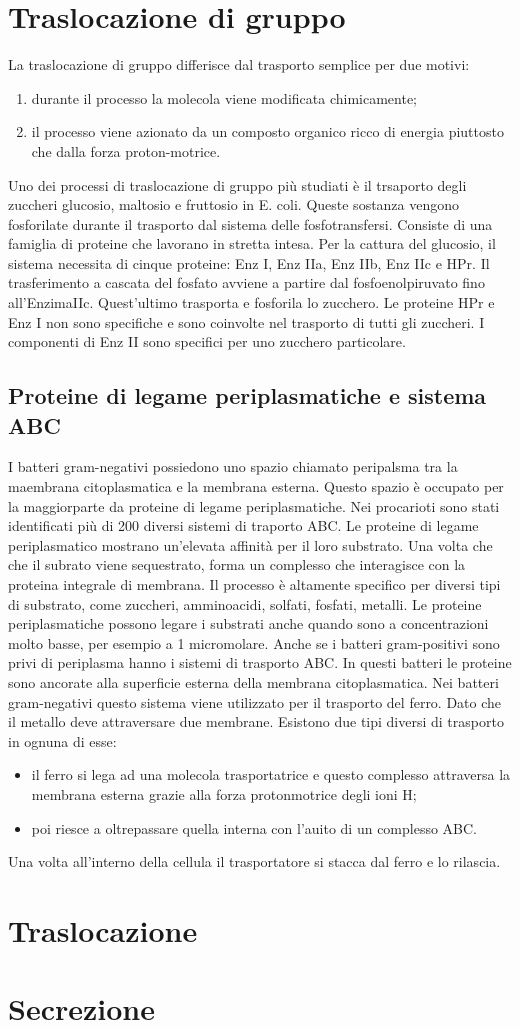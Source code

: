 \section{Traslocazione di gruppo}
La traslocazione di gruppo differisce dal trasporto semplice per due motivi: 
\begin{enumerate}
    \item durante il processo la molecola viene modificata chimicamente;
    \item il processo viene azionato da un composto organico ricco di energia piuttosto che dalla forza proton-motrice.
\end{enumerate}
Uno dei processi di traslocazione di gruppo più studiati \`e il trsaporto degli zuccheri glucosio, maltosio e fruttosio in E. coli. Queste sostanza vengono fosforilate durante il trasporto dal sistema delle fosfotransfersi. Consiste di una famiglia di proteine che lavorano in stretta intesa. Per la cattura del glucosio, il sistema necessita di cinque proteine: Enz I, Enz IIa, Enz IIb, Enz IIc e HPr. Il trasferimento a cascata del fosfato avviene a partire dal fosfoenolpiruvato fino all'EnzimaIIc. Quest'ultimo trasporta e fosforila lo zucchero. Le proteine HPr e Enz I non sono specifiche e sono coinvolte nel trasporto di tutti gli zuccheri. I componenti di Enz II sono specifici per uno zucchero particolare.
\subsection{Proteine di legame periplasmatiche e sistema ABC}
I batteri gram-negativi possiedono uno spazio chiamato peripalsma tra la maembrana citoplasmatica e la membrana esterna. Questo spazio \`e occupato per la maggiorparte da proteine di legame periplasmatiche. 
Nei procarioti sono stati identificati pi\`u di 200 diversi sistemi di traporto ABC. Le proteine di legame periplasmatico mostrano un'elevata affinit\`a per il loro substrato. Una volta che che il subrato viene sequestrato, forma un complesso che interagisce con la proteina integrale di membrana. Il processo \`e altamente specifico per diversi tipi di substrato, come zuccheri, amminoacidi, solfati, fosfati, metalli. Le proteine periplasmatiche possono legare i substrati anche quando sono a concentrazioni molto basse, per esempio a 1 micromolare.
Anche se i batteri gram-positivi sono privi di periplasma hanno i sistemi di trasporto ABC. In questi batteri le proteine sono ancorate alla superficie esterna della membrana citoplasmatica. 
Nei batteri gram-negativi questo sistema viene utilizzato per il trasporto del ferro. Dato che il metallo deve attraversare due membrane. Esistono due tipi diversi di trasporto in ognuna di esse: 
\begin{itemize}
    \item il ferro si lega ad una molecola trasportatrice e questo complesso attraversa la membrana esterna grazie alla forza protonmotrice degli ioni H\ap{+};
    \item poi riesce a oltrepassare quella interna con l'auito di un complesso ABC. 
\end{itemize}
Una volta all'interno della cellula il trasportatore si stacca dal ferro e lo rilascia. 
\section{Traslocazione}
\section{Secrezione}
